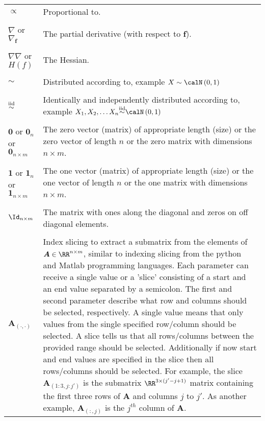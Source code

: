 \begin{longtable}{lp{}}
    $\propto$                                         & Proportional to.
    \\\\
    $\nabla$ or $\nabla_{\bm{f}}$                     & The partial derivative (with respect to $\bm{f}$).
    \\\\
    $\nabla \nabla$ or $H(f)$                         & The Hessian.
    \\\\
    $\sim$                                            & Distributed according to, example $X \sim \calN \left( 0,1 \right)$
    \\\\
    ${\overset{\text{iid}}{\sim}}$                      & Identically and independently distributed according to, example $X_1 , X_2 , \ldots X_n \iid \calN \left( 0,1 \right)$
    \\\\
    $\bm{0}$ or $\bm{0}_{n}$ or $\bm{0}_{n \times m}$ & The zero vector (matrix) of appropriate length (size) or the zero vector of length $n$ or the zero matrix with dimensions $n \times m$.
    \\\\
    $\bm{1}$ or $\bm{1}_{n}$ or $\bm{1}_{n \times m}$ & The one vector (matrix) of appropriate length (size) or the one vector of length $n$ or the one matrix with dimensions $n \times m$.
    \\\\
    $\Id_{n \times m}$                                & The matrix with ones along the diagonal and zeros on off diagonal elements.
    \\\\
    $\bm{A}_{(\cdot,\cdot)}$                          & Index slicing to extract a submatrix from the elements of $\bm{A} \in \RR^{n \times m}$, similar to indexing slicing from the python and Matlab programming languages. Each parameter can receive a single value or a 'slice' consisting of a start and an end value separated by a semicolon. The first and second parameter describe what row and columns should be selected, respectively. A single value means that only values from the single specified row/column should be selected. A slice tells us that all rows/columns between the provided range should be selected. Additionally if now start and end values are specified in the slice then all rows/columns should be selected. For example, the slice $\bm{A}_{(1:3,j:j')}$ is the submatrix $\RR^{3 \times (j' - j + 1)}$ matrix containing the first three rows of $\bm{A}$ and columns $j$ to $j'$. As another example, $\bm{A}_{(:,j)}$ is the $j^{th}$ column of $\bm{A}$.

\end{longtable}
